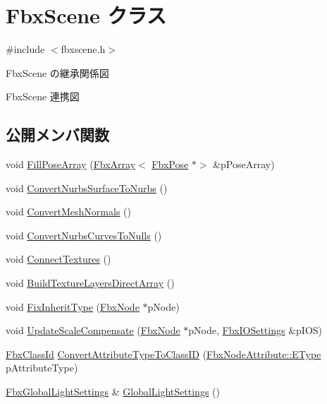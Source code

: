 \hypertarget{class_fbx_scene}{}\section{Fbx\+Scene クラス}
\label{class_fbx_scene}


{\ttfamily \#include $<$fbxscene.\+h$>$}



Fbx\+Scene の継承関係図


Fbx\+Scene 連携図
\subsection*{公開メンバ関数}
\begin{DoxyCompactItemize}
\item 
void \hyperlink{class_fbx_scene_a78c7b7beb811f9c91d98e2dec5eccedc}{Fill\+Pose\+Array} (\hyperlink{class_fbx_array}{Fbx\+Array}$<$ \hyperlink{class_fbx_pose}{Fbx\+Pose} $\ast$$>$ \&p\+Pose\+Array)
\item 
void \hyperlink{class_fbx_scene_abf1c255ce53d570ce7038154c6194f1a}{Convert\+Nurbs\+Surface\+To\+Nurbs} ()
\item 
void \hyperlink{class_fbx_scene_a945048409176af7ce52ecb017cfb69ec}{Convert\+Mesh\+Normals} ()
\item 
void \hyperlink{class_fbx_scene_a9d1fed2b6c643ff2a091928ff8b8b634}{Convert\+Nurbs\+Curves\+To\+Nulls} ()
\item 
void \hyperlink{class_fbx_scene_aeb20ccb008b9d646c00b78780b4b6c16}{Connect\+Textures} ()
\item 
void \hyperlink{class_fbx_scene_a27a6d24089178bc992f59787aef9d319}{Build\+Texture\+Layers\+Direct\+Array} ()
\item 
void \hyperlink{class_fbx_scene_acf98b8d5cee48e3e2301d25814378945}{Fix\+Inherit\+Type} (\hyperlink{class_fbx_node}{Fbx\+Node} $\ast$p\+Node)
\item 
void \hyperlink{class_fbx_scene_a68b89374967020ed469645de47eb4507}{Update\+Scale\+Compensate} (\hyperlink{class_fbx_node}{Fbx\+Node} $\ast$p\+Node, \hyperlink{class_fbx_i_o_settings}{Fbx\+I\+O\+Settings} \&p\+I\+OS)
\item 
\hyperlink{class_fbx_class_id}{Fbx\+Class\+Id} \hyperlink{class_fbx_scene_aca61130d681d641f172117b8ae3e89a0}{Convert\+Attribute\+Type\+To\+Class\+ID} (\hyperlink{class_fbx_node_attribute_a08e1669d3d1a696910756ab17de56d6a}{Fbx\+Node\+Attribute\+::\+E\+Type} p\+Attribute\+Type)
\item 
\hyperlink{class_fbx_global_light_settings}{Fbx\+Global\+Light\+Settings} \& \hyperlink{class_fbx_scene_a0583b181b70f56655f06dbe79b43fcd6}{Global\+Light\+Settings} ()
$$
\end{DoxyCompactItemize}
